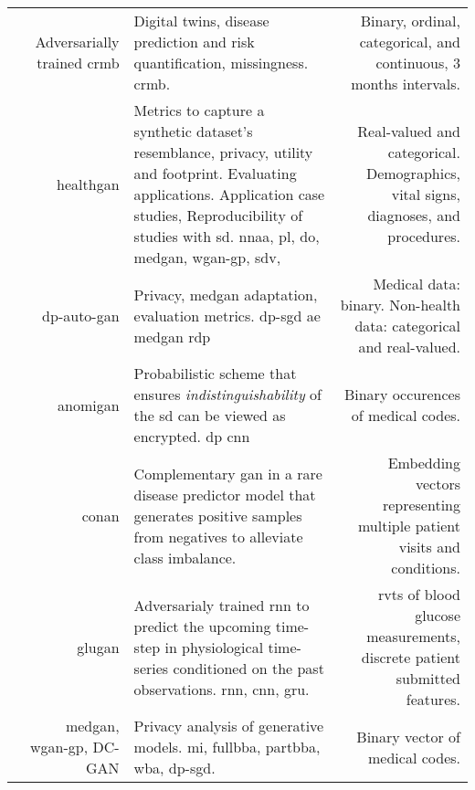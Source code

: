 \begin{center}
\begin{longtable}[l]{@{}p{}NMR@{}}
        \hline
         & & & \\
        \hline
        
        \citeauthor{walsh2020generating} & Adversarially trained \gls{crmb}
        & Digital twins, disease prediction and risk quantification, missingness.   \gls{crmb}.
        & Binary, ordinal, categorical, and continuous, 3 months intervals.\\
        
        \citeauthor{Yale_2020} & \gls{healthgan}
        & Metrics to capture a synthetic dataset’s resemblance, privacy, utility and footprint. Evaluating applications. Application case studies, Reproducibility of studies with \gls{sd}.  \gls{nnaa}, \gls{pl}, \gls{do}, \gls{medgan}, \gls{wgan-gp}, \gls{sdv}, 
        & Real-valued and categorical. Demographics, vital signs, diagnoses, and procedures.\\
        
        \citeauthor{tanti2019} & \gls{dp-auto-gan}
        & Privacy, \gls{medgan} adaptation, evaluation metrics.  \gls{dp-sgd} \gls{ae} \gls{medgan} \gls{rdp}
        & Medical data: binary. Non-health data: categorical and real-valued.\\
        
        \citeauthor{BaeAnomiGAN2020} & \gls{anomigan}
        & Probabilistic scheme that ensures \textit{indistinguishability} of the \gls{sd} can be viewed as encrypted.  \gls{dp} \gls{cnn}
        & Binary occurences of medical codes.\\
        
        \citeauthor{cui2019conan} & \gls{conan}
        & Complementary \gls{gan} in a rare disease predictor model that generates positive samples from negatives to alleviate class imbalance.
        & Embedding vectors representing multiple patient visits and conditions.\\
        
        \citeauthor{zhu_2020} & \gls{glugan}
        & Adversarialy trained \gls{rnn} to predict the upcoming time-step in physiological time-series conditioned on the past observations.  \gls{rnn}, \gls{cnn}, \gls{gru}.
        & \Gls{rvts} of blood glucose measurements, discrete patient submitted features.\\
        
        \citeauthor{chen2019ganleaks} & \gls{medgan}, \gls{wgan-gp}, DC-GAN
        & Privacy analysis of generative models.   \gls{mi}, \gls{fullbba}, \gls{partbba}, \gls{wba}, \gls{dp-sgd}.
        & Binary vector of medical codes.\\
        

\end{longtable}
\end{center}
